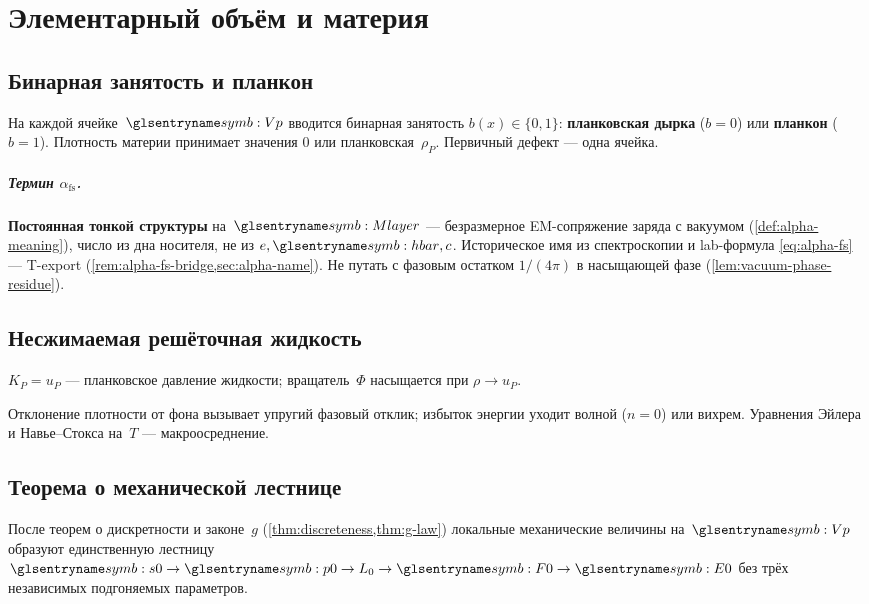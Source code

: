 \chapter{Элементарный объём и материя}
\label{ch:matter}

\section{Бинарная занятость и планкон}
\label{sec:planckon-floor0}

На каждой ячейке~$\PlanckCell$ вводится бинарная занятость $b(x)\in\{0,1\}$:
\textbf{планковская дырка} ($b=0$) или \textbf{планкон} ($b=1$).
Плотность материи принимает значения $0$ или планковская~$\rho_P$.
Первичный дефект --- одна ячейка.

\paragraph{Термин $\alpha_{\mathrm{fs}}$.}
\textbf{Постоянная тонкой структуры} на~$\Mlayer$ --- безразмерное EM-сопряжение заряда с вакуумом
(\cref{def:alpha-meaning}), число из дна носителя, не из $e,\planckHbar,c$.
Историческое имя из спектроскопии и lab-формула \eqref{eq:alpha-fs} --- T-export
(\cref{rem:alpha-fs-bridge,sec:alpha-name}).
Не путать с фазовым остатком $1/(4\pi)$ в насыщающей фазе (\cref{lem:vacuum-phase-residue}).

\section{Несжимаемая решёточная жидкость}

\begin{definition}
\label{def:kp}
$K_P=u_P$ --- планковское давление жидкости;
вращатель~$\Phi$ насыщается при $\rho\to u_P$.
\end{definition}

Отклонение плотности от фона вызывает упругий фазовый отклик;
избыток энергии уходит волной ($n=0$) или вихрем.
Уравнения Эйлера и Навье--Стокса на~$T$ --- макроосреднение.

\section{Теорема о механической лестнице}
\label{sec:theorem-51}

\begin{theorem}
\label{thm:51}
После теорем о дискретности и законе~$g$ (\cref{thm:discreteness,thm:g-law}) локальные механические величины на~$\hv$ образуют
единственную лестницу $\ladderAction\to \ladderMomentum\to L_0\to \ladderForce\to \ladderEnergy$
без трёх независимых подгоняемых параметров.
\end{theorem}

